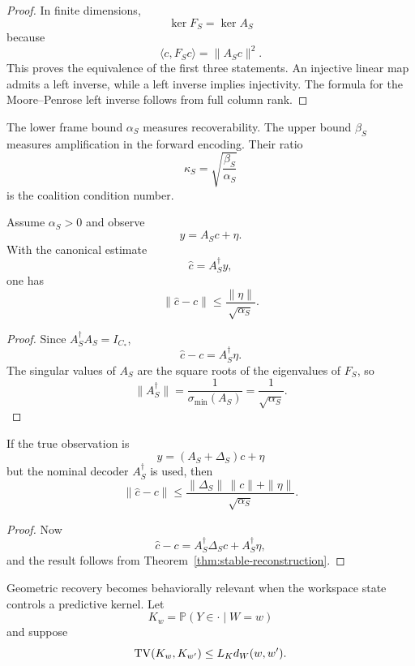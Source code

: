 \begin{proof}
In finite dimensions,
\[
\ker F_S=\ker A_S
\]
because
\[
\langle c,F_Sc\rangle=\|A_Sc\|^2.
\]
This proves the equivalence of the first three statements. An injective linear
map admits a left inverse, while a left inverse implies injectivity. The
formula for the Moore--Penrose left inverse follows from full column rank.
\end{proof}

The lower frame bound \(\alpha_S\) measures recoverability. The upper bound
\(\beta_S\) measures amplification in the forward encoding. Their ratio
\[
\kappa_S=\sqrt{\frac{\beta_S}{\alpha_S}}
\]
is the coalition condition number.



\begin{theorem}\label{thm:stable-reconstruction}
Assume \(\alpha_S>0\) and observe
\[
y=A_Sc+\eta.
\]
With the canonical estimate
\[
\widehat c=A_S^\dagger y,
\]
one has
\[
\boxed{
\|\widehat c-c\|
\leq
\frac{\|\eta\|}{\sqrt{\alpha_S}}.
}
\]
\end{theorem}

\begin{proof}
Since \(A_S^\dagger A_S=I_{C_*}\),
\[
\widehat c-c=A_S^\dagger\eta.
\]
The singular values of \(A_S\) are the square roots of the eigenvalues of
\(F_S\), so
\[
\|A_S^\dagger\|
=
\frac{1}{\sigma_{\min}(A_S)}
=
\frac{1}{\sqrt{\alpha_S}}.
\]
\end{proof}

\begin{corollary}\label{cor:encoding-mismatch}
If the true observation is
\[
y=(A_S+\Delta_S)c+\eta
\]
but the nominal decoder \(A_S^\dagger\) is used, then
\[
\boxed{
\|\widehat c-c\|
\leq
\frac{\|\Delta_S\|\,\|c\|+\|\eta\|}{\sqrt{\alpha_S}}.
}
\]
\end{corollary}

\begin{proof}
Now
\[
\widehat c-c=A_S^\dagger\Delta_Sc+A_S^\dagger\eta,
\]
and the result follows from Theorem~\ref{thm:stable-reconstruction}.
\end{proof}


Geometric recovery becomes behaviorally relevant when the workspace state
controls a predictive kernel. Let
\[
K_w=\mathbb P(Y\in\cdot\mid W=w)
\]
and suppose
\[
\operatorname{TV}(K_w,K_{w'})\leq L_Kd_W(w,w').
\]

